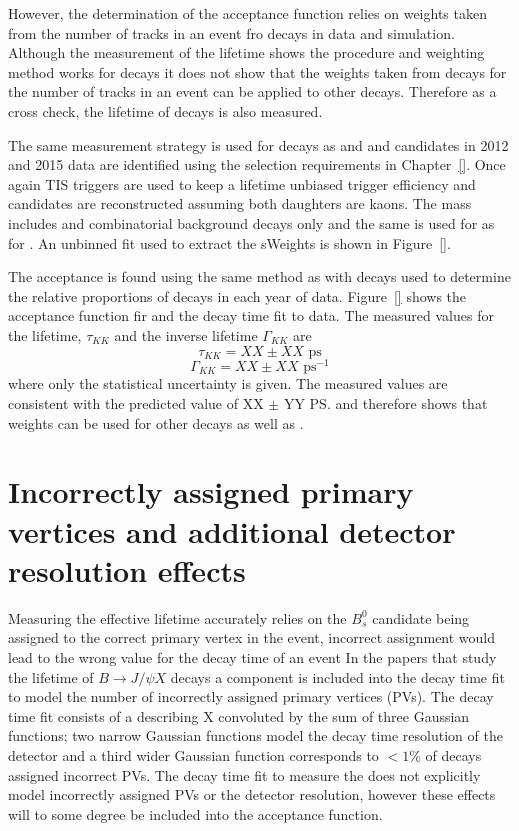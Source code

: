 However, the determination of the \bsmumu acceptance function relies on weights taken from the number of tracks in an event fro \bdkpi decays in data and simulation. Although the measurement of the \bdkpi lifetime shows the procedure and weighting method works for \bdkpi decays it does not show that the weights taken from \bdkpi decays for the number of tracks in an event can be applied to other decays. Therefore as a cross check, the lifetime of \bskk decays is also measured. 

The same measurement strategy is used for \bskk decays as \bsmumu and \bdkpi and candidates in 2012 and 2015 data are identified using the selection requirements in Chapter~\ref{}. Once again TIS triggers are used to keep a lifetime unbiased trigger efficiency and candidates are reconstructed assuming both daughters are kaons. The mass \pdf includes \bskk and combinatorial background decays only and the same \pdf is used for \bskk as for \bskpi. An unbinned \ml fit used to extract the sWeights is shown in Figure~\ref{}. 

The \bskk acceptance is found using the same method as \bsmumu with \bsjpisphi decays used to determine the relative proportions of decays in each year of data. Figure~\ref{} shows the acceptance function fir and the decay time fit to data. The measured values for the lifetime, $\tau_{KK}$ and the inverse lifetime $\Gamma_{KK}$ are
\begin{equation}
\tau_{KK} = XX \pm XX  \text{ ps} 
\end{equation}
\begin{equation}
\Gamma_{KK} = XX  \pm XX \text{ ps}^{-1}
\end{equation}
where only the statistical uncertainty is given. The measured values are consistent with the predicted value of XX $\pm$ YY \ps \cite{} and therefore shows that \bdkpi weights can be used for other decays as well as \bdkpi. 


\section{Incorrectly assigned primary vertices and additional detector resolution effects}
\label{sec:PVcheck}
Measuring the \bsmumu effective lifetime accurately relies on the $B^{0}_{s}$ candidate being assigned to the correct primary vertex in the event, incorrect assignment would lead to the wrong value for the decay time of an event
In the papers \cite{} that study the lifetime of $B \to J/\psi X$ decays a component is included into the decay time fit to model the number of incorrectly assigned primary vertices (PVs). The decay time fit consists of a \pdf describing X convoluted by the sum of three Gaussian functions; two narrow Gaussian functions model the decay time resolution of the detector and a third wider Gaussian function corresponds to $<1\%$ of decays assigned incorrect PVs. The decay time fit to measure the \bsmumu \el does not explicitly model incorrectly assigned PVs or the detector resolution, however these effects will to some degree be included into the acceptance function. 

